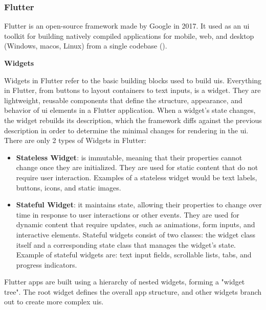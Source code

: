 \begin{multicols}{2}
      \subsubsection{Flutter}
      Flutter is an open-source framework made by Google in 2017. It used as an \acrshort{ui} toolkit for building
      natively compiled applications for mobile, web, and desktop (Windows, mac\acrshort{os}, Linux) from a single
      codebase (\textit{\cite{flutter}}).

      \textbf{Widgets}

      Widgets in Flutter refer to the basic building blocks used to build \acrshort{ui}s. Everything in Flutter, from
      buttons to layout containers to text inputs, is a widget. They are lightweight, reusable components that
      define the structure, appearance, and behavior of \acrshort{ui} elements in a Flutter application. When a widget's
      state changes, the widget rebuilds its description, which the framework diffs against the previous description
      in order to determine the minimal changes for rendering in the \acrshort{ui}. There are only 2 types of Widgets
      in Flutter:
      \begin{itemize}
            \item \textbf{Stateless Widget}: is immutable, meaning that their properties cannot change once they are
                  initialized. They are used for static content that do not require user interaction. Examples of a
                  stateless widget would be text labels, buttons, icons, and static images.
            \item \textbf{Stateful Widget}: it maintains state, allowing their properties to change over time in response
                  to user interactions or other events. They are used for dynamic content that require updates, such as
                  animations, form inputs, and interactive elements. Stateful widgets consist of two classes: the widget
                  class itself and a corresponding state class that manages the widget's state. Example of stateful widgets
                  are: text input fields, scrollable lists, tabs, and progress indicators.
      \end{itemize}
      Flutter apps are built using a hierarchy of nested widgets, forming a "widget tree". The root widget defines the
      overall app structure, and other widgets branch out to create more complex \acrshort{ui}s.
\end{multicols}

